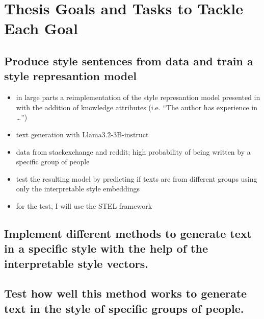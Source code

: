 
\section{Thesis Goals and Tasks to Tackle Each Goal}
  \subsection{Produce style sentences from data and train a style represantion model}
  \begin{itemize}
    \item in large parts a reimplementation of the style represantion model presented in \citet{patelLearningInterpretableStyle2023} with the addition of knowledge attributes (i.e. \enquote{The author has experience in \ldots})
    \item text generation with Llama3.2-3B-instruct~\cite{dubeyLlama3Herd2024}
    \item data from stackexchange and reddit; high probability of being written by a specific group of people
    \item test the resulting model by predicting if texts are from different groups using only the interpretable style embeddings
    \item for the test, I will use the STEL framework\cite{wegmann-nguyen-2021-capture}
  \end{itemize}
   \subsection{Implement different methods to generate text in a specific style with the help of the interpretable style vectors.}
   \subsection{Test how well this method works to generate text in the style of specific groups of people.}


